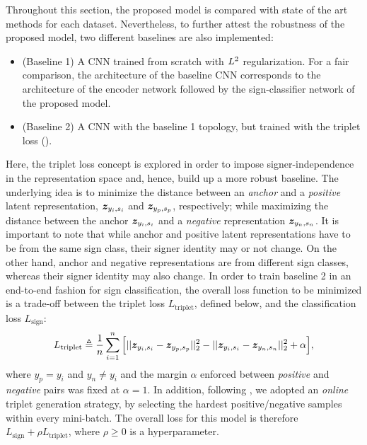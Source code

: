Throughout this section, the proposed model is compared with state of the art methods for each dataset. Nevertheless, to further attest the robustness of the proposed model, two different baselines are also implemented:
\begin{itemize}
    \item (Baseline 1) A CNN trained from scratch with $L^2$ regularization. For a fair comparison, the architecture of the baseline CNN corresponds to the architecture of the encoder network followed by the sign-classifier network of the proposed model.
    \item (Baseline 2) A CNN with the baseline 1 topology, but trained with the triplet loss (\citet{Schroff2015}).
\end{itemize}
Here, the triplet loss concept is explored in order to impose signer-independence in the representation space and, hence, build up a more robust baseline. The underlying idea is to minimize the distance between an \textit{anchor} and a \textit{positive} latent representation, ${\bm{z}}_{y_{i}, s_{i}}$ and ${\bm{z}}_{y_{p}, s_{p}}$, respectively; while maximizing the distance between the anchor ${\bm{z}}_{y_{i}, s_{i}}$ and a \textit{negative} representation ${\bm{z}}_{y_{n}, s_{n}}$. It is important to note that while anchor and positive latent representations have to be from the same sign class, their signer identity may or not change. On the other hand, anchor and negative representations are from different sign classes, whereas their signer identity may also change. In order to train baseline 2 in an end-to-end fashion for sign classification, the overall loss function to be minimized is a trade-off between the triplet loss $L_{\text{triplet}}$, defined below, and the classification loss $L_{\text{sign}}$:
\begin{equation}
L_{\text{triplet}} \triangleq \frac{1}{n}\sum_{i=1}^{n}\Big[||{\bm{z}}_{y_{i}, s_{i}}-{\bm{z}}_{y_{p}, s_{p}}||^2_2 - ||{\bm{z}}_{y_{i}, s_{i}}-{\bm{z}}_{y_{n}, s_{n}}||^2_2 + \alpha\Big],
\end{equation}
where $y_{p}=y_{i}$ and $y_{n} \neq y_{i}$ and the margin $\alpha$ enforced between \emph{positive} and \emph{negative} pairs was fixed at $\alpha=1$. In addition, following \citet{Schroff2015}, we adopted an \emph{online} triplet generation strategy, by selecting the hardest positive/negative samples within every mini-batch. The overall loss for this model is therefore $L_{\text{sign}} + \rho L_{\text{triplet}}$, where $\rho \geq 0$ is a hyperparameter.


